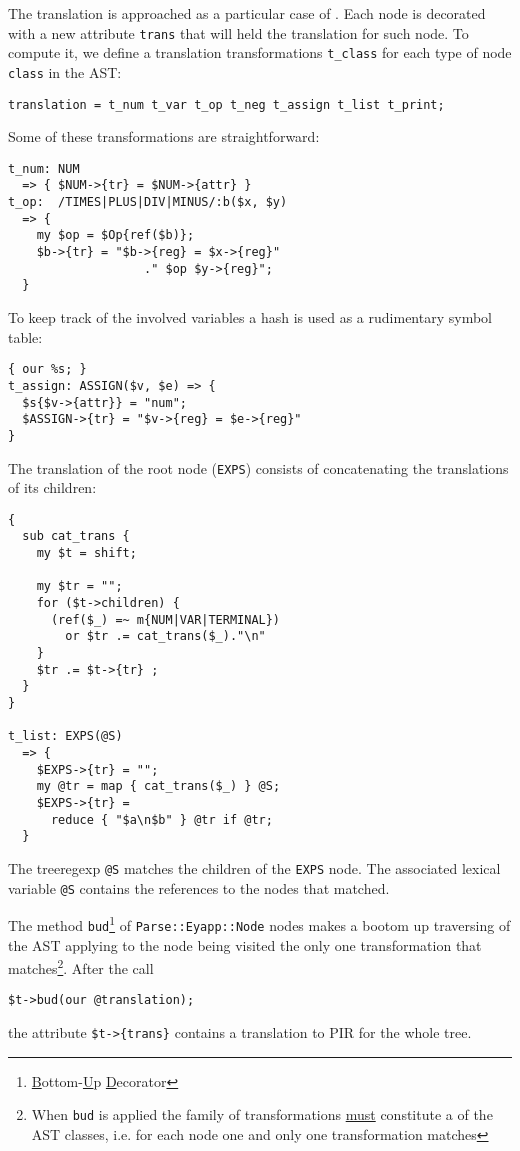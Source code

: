 The translation is approached as a particular case of 
. Each node is decorated with a new
attribute \verb|trans|  that will held 
the translation for such node.
To compute it, we define  a translation transformations
\verb|t_class| for each type of node \verb|class| in the AST:
\begin{verbatim}
translation = t_num t_var t_op t_neg t_assign t_list t_print;
\end{verbatim}

Some of these transformations are straightforward:
\begin{verbatim}
t_num: NUM 
  => { $NUM->{tr} = $NUM->{attr} }
t_op:  /TIMES|PLUS|DIV|MINUS/:b($x, $y)
  => {
    my $op = $Op{ref($b)};
    $b->{tr} = "$b->{reg} = $x->{reg}"
                   ." $op $y->{reg}";
  }
\end{verbatim}
To keep track of the involved variables
a hash is used as a rudimentary symbol table:
\begin{verbatim}
{ our %s; }
t_assign: ASSIGN($v, $e) => {
  $s{$v->{attr}} = "num";
  $ASSIGN->{tr} = "$v->{reg} = $e->{reg}"
}
\end{verbatim}
The translation of the root node (\verb|EXPS|)
consists of concatenating the translations
of its children:
\begin{verbatim}
{
  sub cat_trans {
    my $t = shift;

    my $tr = "";
    for ($t->children) {
      (ref($_) =~ m{NUM|VAR|TERMINAL})
        or $tr .= cat_trans($_)."\n"
    }
    $tr .= $t->{tr} ;
  }
}

t_list: EXPS(@S)
  => {
    $EXPS->{tr} = "";
    my @tr = map { cat_trans($_) } @S;
    $EXPS->{tr} =
      reduce { "$a\n$b" } @tr if @tr;
  }
\end{verbatim}
The treeregexp \verb|@S| matches the children
of the \verb|EXPS| node. The associated lexical variable \verb|@S| 
contains the references to the nodes that 
matched.

The method \verb|bud|\footnote{\underline{B}ottom-\underline{U}p \underline{D}ecorator}
of \verb|Parse::Eyapp::Node| nodes makes a bootom up traversing
of the AST applying to the node being visited the only one transformation that 
matches\footnote{When {\tt bud} is applied the family of transformations \underline{must} constitute
a  of the AST classes, i.e. for each node one and only one
transformation matches}.
After the call 
\begin{verbatim}
$t->bud(our @translation);
\end{verbatim}
the attribute \verb|$t->{trans}| contains 
a translation to PIR for the whole tree.
